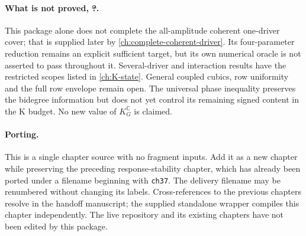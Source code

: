\paragraph{What is not proved, \st{?}.}
This package alone does not complete the all-amplitude coherent
one-driver cover; that is supplied later by \autoref{ch:complete-coherent-driver}.
Its four-parameter reduction remains an explicit sufficient target, but
its own numerical oracle is not asserted to pass throughout it.
Several-driver and interaction results have the restricted scopes listed
in \autoref{ch:K-state}. General coupled cubics, row uniformity and the
full row envelope remain open. The universal
phase inequality preserves the bidegree information but does not yet
control its remaining signed content in the K budget.
No new value of $K_G^{\mathbb C}$ is claimed.

\paragraph{Porting.}
This is a single chapter source with no fragment inputs. Add it as a
new chapter while preserving the preceding response-stability chapter,
which has already been ported under a filename beginning with
\texttt{ch37}. The delivery filename may be renumbered without changing
its labels. Cross-references to the previous chapters resolve in the
handoff manuscript; the supplied standalone wrapper compiles this
chapter independently. The live repository and its existing chapters
have not been edited by this package.
